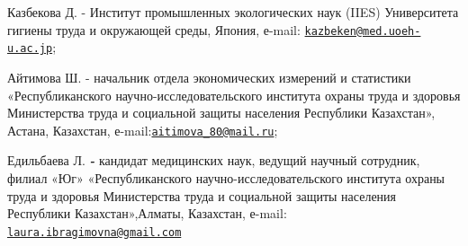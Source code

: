 \begin{authorinfo}
Казбекова Д. - Институт промышленных экологических наук (IIES)
Университета гигиены труда и окружающей среды, Япония, е-mail:
\href{mailto:kazbeken@med.uoeh-u.ac.jp}{\nolinkurl{kazbeken@med.uoeh-u.ac.jp}};

Айтимова Ш. - начальник отдела экономических измерений и статистики
«Республиканского научно-исследовательского института охраны труда и
здоровья Министерства труда и социальной защиты населения Республики
Казахстан», Астана, Казахстан,
е-mail:\href{mailto:aitimova_80@mail.ru}{\nolinkurl{aitimova\_80@mail.ru}};

Едильбаева Л. \emph{{\bfseries -}} кандидат медицинских наук, ведущий
научный сотрудник, филиал «Юг» «Республиканского
научно-исследовательского института охраны труда и здоровья Министерства
труда и социальной защиты населения Республики Казахстан»,Алматы,
Казахстан, е-mail:
\href{mailto:laura.ibragimovna@gmail.com}{\nolinkurl{laura.ibragimovna@gmail.com}}
\end{authorinfo}
